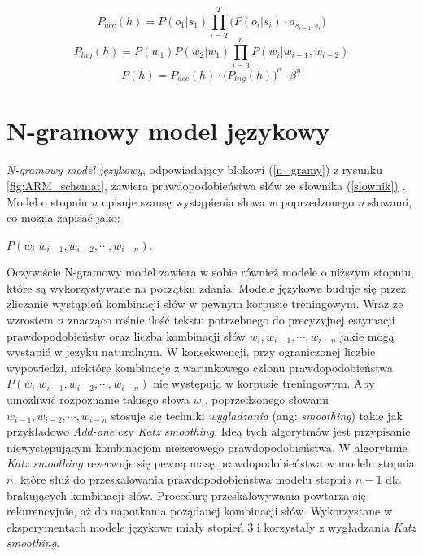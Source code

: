 \documentclass[shortabstract, mgr]{iithesis}
\newcommand{\refBlock}[1]{(\hyperref[#1]{\ref*{#1})}
}
\begin{document}
		\begin{equation}
			P_{acc}(h) = P(o_1|s_1) \prod_{i=2}^T \bigg(P(o_i|s_i) \cdot a_{s_{i-1},s_i}\bigg)
		\end{equation}
		\begin{equation}
			P_{lng}(h) = P(w_1)P(w_2|w_1)\prod_{i=3}^nP(w_i|w_{i-1},w_{i-2})
		\end{equation}
		\begin{equation}
			P(h) = P_{acc}(h) \cdot \bigg(P_{lng}(h)\bigg)^\alpha \cdot \beta^n
		\label{eqn:h_score}
		\end{equation}
	
\section{N-gramowy model językowy}
	\label{sec:ngramm}
	\textit{N-gramowy model językowy}, odpowiadający blokowi \refBlock{n_gramy} z rysunku \ref{fig:ARM_schemat}, zawiera prawdopodobieństwa słów ze słownika \refBlock{slownik}. Model o stopniu $n$ opisuje szansę wystąpienia słowa $w$ poprzedzonego $n$ słowami, co można zapisać jako: 
	\begin{center}
		 $P(w_i|w_{i-1},w_{i-2},\cdots,w_{i-n})$.
	\end{center}
	 Oczywiście N-gramowy model zawiera w sobie również modele o niższym stopniu, które są wykorzystywane na początku zdania. Modele językowe buduje się przez zliczanie wystąpień kombinacji słów w pewnym korpusie treningowym. Wraz ze wzrostem $n$ znacząco rośnie ilość tekstu potrzebnego do precyzyjnej estymacji prawdopodobieństw oraz liczba kombinacji słów $w_i, w_{i-1}, \cdots, w_{i-n}$ jakie mogą wystąpić w języku naturalnym. W konsekwencji, przy ograniczonej liczbie wypowiedzi, niektóre kombinacje z warunkowego członu prawdopodobieństwa  $P(w_i|w_{i-1},w_{i-2},\cdots,w_{i-n})$ nie występują w korpusie treningowym. Aby umożliwić rozpoznanie takiego słowa $w_i$, poprzedzonego słowami $w_{i-1},w_{i-2},\cdots,w_{i-n}$ stosuje się techniki \textit{wygładzania} (ang: \textit{smoothing}) takie jak przykładowo \textit{Add-one} czy \textit{Katz smoothing}. Ideą tych algorytmów jest przypisanie niewystępującym kombinacjom niezerowego prawdopodobieństwa. W algorytmie \textit{Katz smoothing} rezerwuje się pewną masę prawdopodobieństwa w modelu stopnia $n$, które służ do przeskalowania prawdopodobieństwa modelu stopnia $n-1$ dla brakujących kombinacji słów. Procedurę przeskalowywania powtarza się rekurencyjnie, aż do napotkania pożądanej kombinacji słów.  Wykorzystane w eksperymentach modele językowe miały stopień $3$ i korzystały z wygładzania \textit{Katz smoothing}.
\end{document}
